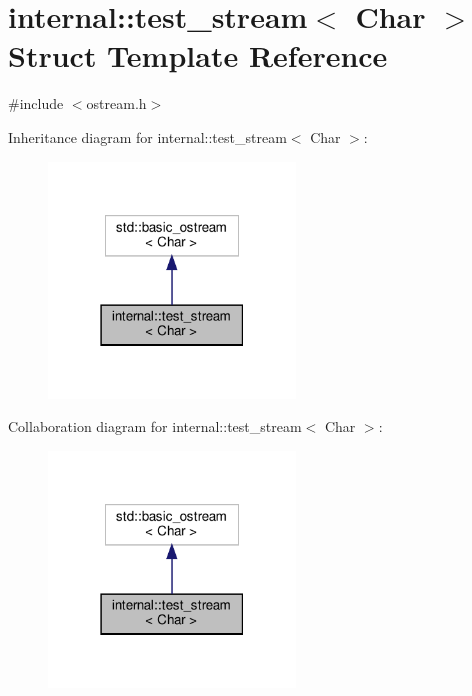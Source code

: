 \hypertarget{structinternal_1_1test__stream}{}\section{internal\+:\+:test\+\_\+stream$<$ Char $>$ Struct Template Reference}
\label{structinternal_1_1test__stream}


{\ttfamily \#include $<$ostream.\+h$>$}



Inheritance diagram for internal\+:\+:test\+\_\+stream$<$ Char $>$\+:
\nopagebreak
\begin{figure}[H]
\begin{center}
\leavevmode
\includegraphics[width=186pt]{structinternal_1_1test__stream__inherit__graph}
\end{center}
\end{figure}


Collaboration diagram for internal\+:\+:test\+\_\+stream$<$ Char $>$\+:
\nopagebreak
\begin{figure}[H]
\begin{center}
\leavevmode
\includegraphics[width=186pt]{structinternal_1_1test__stream__coll__graph}
\end{center}
\end{figure}


